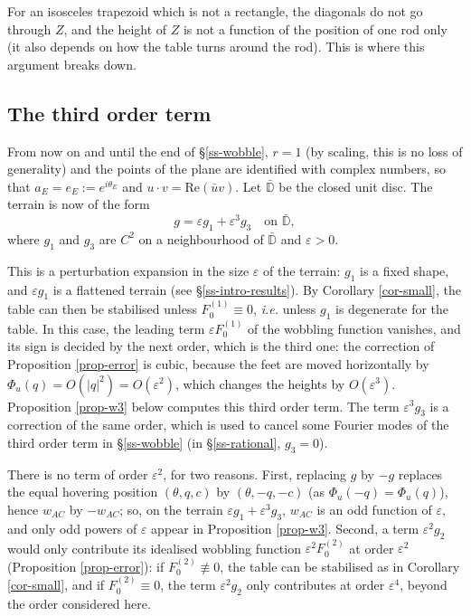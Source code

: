 \documentclass[a4paper,11pt,twoside,leqno]{article}
\newcommand{\ie}[0]{\emph{i.e.} }
\newcommand{\eps}[0]{\varepsilon}
\numberwithin{equation}{section}
\begin{document}
For an isosceles trapezoid which is not a rectangle, the diagonals do not go through $Z$, and the height of $Z$ is not a function of the position of one rod only (it also depends on how the table turns around the rod). This is where this argument breaks down.

\subsection{The third order term}\label{ss-3ord}

From now on and until the end of \S{}\ref{ss-wobble}, $r = 1$ (by scaling, this is no loss of generality) and the points of the plane are identified with complex numbers, so that $a_E = e_E := e^{i\theta_E}$ and $u \cdot v = \mathrm{Re}(\bar u v)$. Let $\bar{\mathbb{D}}$ be the closed unit disc. The terrain is now of the form
\[
g = \eps g_1 + \eps^3 g_3 \quad \text{on } \bar{\mathbb{D}},
\]
where $g_1$ and $g_3$ are $C^2$ on a neighbourhood of $\bar{\mathbb{D}}$ and $\eps > 0$.

This is a perturbation expansion in the size $\eps$ of the terrain: $g_1$ is a fixed shape, and $\eps g_1$ is a flattened terrain (see \S{}\ref{ss-intro-results}). By Corollary \ref{cor-small}, the table can then be stabilised unless $F_0^{(1)} \equiv 0$, \ie unless $g_1$ is degenerate for the table. In this case, the leading term $\eps F_0^{(1)}$ of the wobbling function vanishes, and its sign is decided by the next order, which is the third one: the correction of Proposition \ref{prop-error} is cubic, because the feet are moved horizontally by $\Phi_u(q) = O(|q|^2) = O(\eps^2)$, which changes the heights by $O(\eps^3)$. Proposition \ref{prop-w3} below computes this third order term. The term $\eps^3 g_3$ is a correction of the same order, which is used to cancel some Fourier modes of the third order term in \S{}\ref{ss-wobble} (in \S{}\ref{ss-rational}, $g_3 = 0$).

There is no term of order $\eps^2$, for two reasons. First, replacing $g$ by $-g$ replaces the equal hovering position $(\theta, q, c)$ by $(\theta, -q, -c)$ (as $\Phi_u(-q) = \Phi_u(q)$), hence $w_{AC}$ by $-w_{AC}$; so, on the terrain $\eps g_1 + \eps^3 g_3$, $w_{AC}$ is an odd function of $\eps$, and only odd powers of $\eps$ appear in Proposition \ref{prop-w3}. Second, a term $\eps^2 g_2$ would only contribute its idealised wobbling function $\eps^2 F_0^{(2)}$ at order $\eps^2$ (Proposition \ref{prop-error}): if $F_0^{(2)} \not\equiv 0$, the table can be stabilised as in Corollary \ref{cor-small}, and if $F_0^{(2)} \equiv 0$, the term $\eps^2 g_2$ only contributes at order $\eps^4$, beyond the order considered here.
\end{document}
